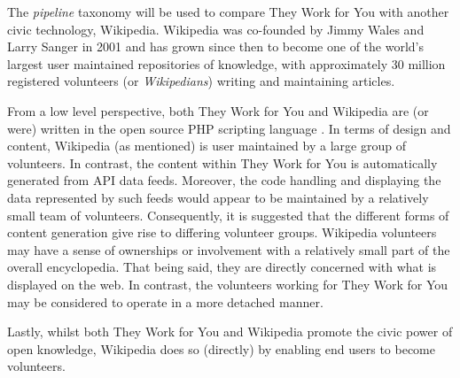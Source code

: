 The \emph{pipeline} taxonomy will be used to compare They Work for You with another civic technology, Wikipedia.
Wikipedia was co-founded by Jimmy Wales \cite{jimmy-wales} and Larry Sanger \cite{larry-sanger} in 2001 and has grown since then to become one of the world's largest user maintained repositories of knowledge, with approximately 30 million registered volunteers (or \emph{Wikipedians}) writing and maintaining articles.

From a low level perspective, both They Work for You and Wikipedia are (or were) written in the open source PHP scripting language \cite{php}.
In terms of design and content, Wikipedia (as mentioned) is user maintained by a large group of volunteers.
In contrast, the content within They Work for You is automatically generated from API data feeds.
Moreover, the code handling and displaying the data represented by such feeds would appear to be maintained by a relatively small team of volunteers.
Consequently, it is suggested that the different forms of content generation give rise to differing volunteer groups. Wikipedia volunteers may have a sense of ownerships or involvement with a relatively small part of the overall encyclopedia.  That being said, they are directly concerned with what is displayed on the web. In contrast, the volunteers working for They Work for You may be considered to operate in a more detached manner.

Lastly, whilst both They Work for You and Wikipedia promote the civic power of open knowledge, Wikipedia does so (directly) by enabling end users to become volunteers. 